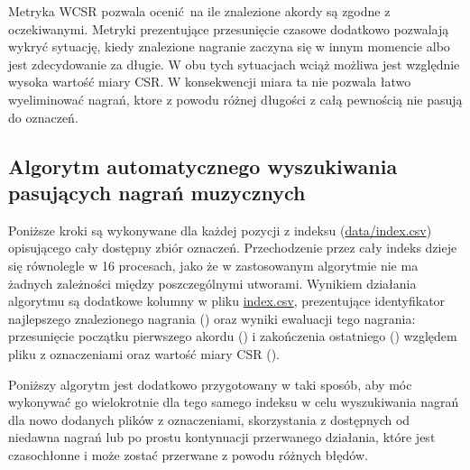 Metryka WCSR pozwala ocenić na ile znalezione akordy są zgodne z oczekiwanymi. Metryki prezentujące przesunięcie czasowe dodatkowo pozwalają wykryć sytuację, kiedy znalezione nagranie zaczyna się w innym momencie albo jest zdecydowanie za długie. W obu tych sytuacjach wciąż możliwa jest względnie wysoka wartość miary CSR. W konsekwencji miara ta nie pozwala łatwo wyeliminować nagrań, ktore z powodu różnej długości z całą pewnością nie pasują do oznaczeń.

\subsection{Algorytm automatycznego wyszukiwania pasujących nagrań muzycznych}

Poniższe kroki są wykonywane dla każdej pozycji z indeksu (\url{data/index.csv}) opisującego cały dostępny zbiór oznaczeń. Przechodzenie przez cały indeks dzieje się równolegle w 16 procesach, jako że w zastosowanym algorytmie nie ma żadnych zależności między poszczególnymi utworami. Wynikiem działania algorytmu są dodatkowe kolumny w pliku \url{index.csv}, prezentujące identyfikator najlepszego znalezionego nagrania () oraz wyniki ewaluacji tego nagrania: przesunięcie początku pierwszego akordu () i zakończenia ostatniego () względem pliku z oznaczeniami oraz wartość miary CSR ().

Poniższy algorytm jest dodatkowo przygotowany w taki sposób, aby móc wykonywać go wielokrotnie dla tego samego indeksu w celu wyszukiwania nagrań dla nowo dodanych plików z oznaczeniami, skorzystania z dostępnych od niedawna nagrań lub po prostu kontynuacji przerwanego działania, które jest czasochłonne i może zostać przerwane z powodu różnych błędów.

